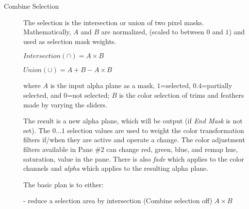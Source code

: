 \begin{description}
    \item[Combine Selection] The selection is the intersection or union of two pixel masks. Mathematically, $A$ and $B$ are normalized, (scaled to between $0$ and $1$) and used as selection mask weights.

    $Intersection (\cap) = A\times B$

    $Union (\cup)= A+B-A\times B$

    where $A$ is the input alpha plane as a mask, $1$=selected, $0.4$=partially selected, and $0$=not selected; $B$ is the color selection of trims and feathers made by varying the sliders.

    The result is a new alpha plane, which will be output (if \textit{End Mask} is not set). The $0\dots1$ selection values are used to weight the color transformation filters if/when they are active and operate a change. The color adjustment filters available in Pane \#$2$ can change red, green, blue, and remap hue, saturation, value in the pane. There is also \textit{fade} which applies to the color channels and \textit{alpha} which applies to the resulting alpha plane.

    The basic plan is to either:

    - reduce a selection area by intersection (Combine selection off) $A \times B$


\end{description}
